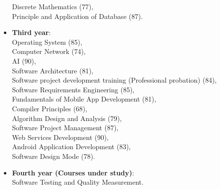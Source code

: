 \begin{itemize}
		\hspace*{2em}Discrete Mathematics (77), \\
		\hspace*{2em}Principle and Application of Database (87).\\
	\item \textbf{Third year}: \\
		\hspace*{2em}Operating System (85), \\
		\hspace*{2em}Computer Network (74), \\
		\hspace*{2em}AI (90), \\
		\hspace*{2em}Software Architecture (81), \\
		\hspace*{2em}Software project development training (Professional probation) (84), \\
		\hspace*{2em}Software Requirements Engineering (85), \\
		\hspace*{2em}Fundamentals of Mobile App Development (81),\\
		\hspace*{2em}Compiler Principles (68), \\
		\hspace*{2em}Algorithm Design and Analysis (79), \\
		\hspace*{2em}Software Project Management (87), \\
		\hspace*{2em}Web Services Development (90), \\
		\hspace*{2em}Android Application Development (83), \\
		\hspace*{2em}Software Design Mode (78).\\
	\item \textbf{Fourth year (Courses under study)}: \\
		\hspace*{2em}Software Testing and Quality Measurement.\\
\end{itemize}